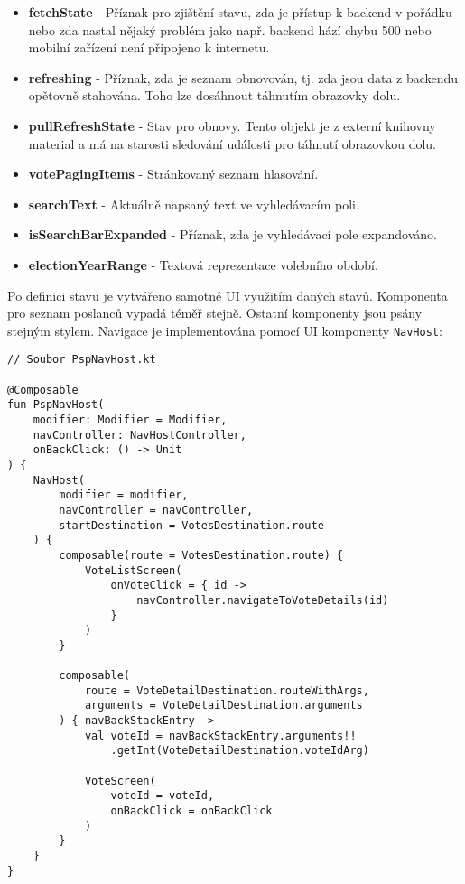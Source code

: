 \begin{itemize}
	\item \textbf{fetchState} - Příznak pro zjištění stavu, zda je přístup k backend v pořádku nebo zda nastal nějaký problém jako např. backend hází chybu 500 nebo mobilní zařízení není připojeno \linebreak k internetu.
	
	\item \textbf{refreshing} - Příznak, zda je seznam obnovován, tj. zda jsou data z backendu opětovně stahována. Toho lze dosáhnout táhnutím obrazovky dolu.
	
	\item \textbf{pullRefreshState} - Stav pro obnovy. Tento objekt je z externí knihovny material a má na starosti sledování události pro táhnutí obrazovkou dolu.
	
	\item \textbf{votePagingItems} - Stránkovaný seznam hlasování.
	
	\item \textbf{searchText} - Aktuálně napsaný text ve vyhledávacím poli.
	
	\item \textbf{isSearchBarExpanded} - Příznak, zda je vyhledávací pole expandováno.
	
	\item \textbf{electionYearRange} - Textová reprezentace volebního období.
\end{itemize}

\noindent Po definici stavu je vytvářeno samotné UI využitím daných stavů. Komponenta pro seznam poslanců vypadá téměř stejně. Ostatní komponenty jsou psány stejným stylem. Navigace je implementována pomocí UI komponenty \lstinline|NavHost|:

\begin{lstlisting}[caption={Komponenta pro navigaci}, tabsize=2]
// Soubor PspNavHost.kt

@Composable
fun PspNavHost(
	modifier: Modifier = Modifier,
	navController: NavHostController,
	onBackClick: () -> Unit
) {
	NavHost(
		modifier = modifier,
		navController = navController,
		startDestination = VotesDestination.route
	) {
		composable(route = VotesDestination.route) {
			VoteListScreen(
				onVoteClick = { id ->
					navController.navigateToVoteDetails(id)
				}
			)
		}
	
		composable(
			route = VoteDetailDestination.routeWithArgs,
			arguments = VoteDetailDestination.arguments
		) { navBackStackEntry ->
			val voteId = navBackStackEntry.arguments!!
				.getInt(VoteDetailDestination.voteIdArg)
			
			VoteScreen(
				voteId = voteId,
				onBackClick = onBackClick
			)
		}
	}
}
\end{lstlisting}

